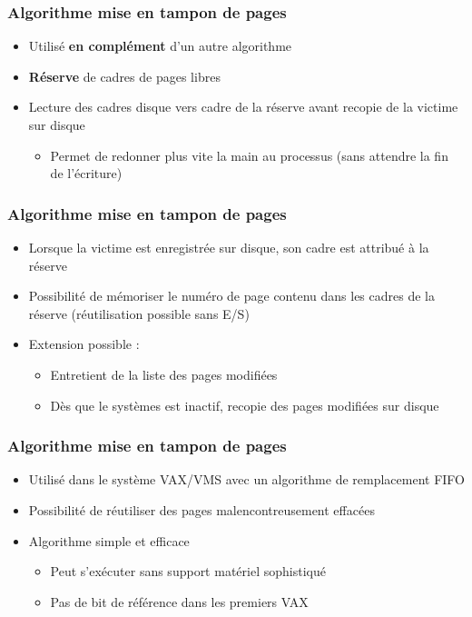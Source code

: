 \begin{frame}
\frametitle{Algorithme mise en tampon de pages}
\begin{itemize}
\item Utilisé \textbf{en complément} d'un autre algorithme
\item \textbf{Réserve} de cadres de pages libres
\item Lecture des cadres disque vers cadre de la réserve avant recopie de la victime sur disque
\begin{itemize}
\item Permet de redonner plus vite la main au processus (sans attendre la fin de l'écriture)
\end{itemize}
\end{itemize}
\end{frame}


\begin{frame}
\frametitle{Algorithme mise en tampon de pages}
\begin{itemize}
\item Lorsque la victime est enregistrée sur disque, son cadre est attribué à la réserve
\item Possibilité de mémoriser le numéro de page contenu dans les cadres de la réserve (réutilisation possible sans E/S)
\item Extension possible :
\begin{itemize}
\item Entretient de la liste des pages modifiées
\item Dès que le systèmes est inactif, recopie des pages modifiées sur disque
\end{itemize}
\end{itemize}
\end{frame}


\begin{frame}
\frametitle{Algorithme mise en tampon de pages}
\begin{itemize}
\item Utilisé dans le système VAX/VMS avec un algorithme de remplacement FIFO
\item Possibilité de réutiliser des pages malencontreusement effacées
\item Algorithme simple et efficace
\begin{itemize}
\item Peut s'exécuter sans support matériel sophistiqué
\item Pas de bit de référence dans les premiers VAX
\end{itemize}
\end{itemize}
\end{frame}

